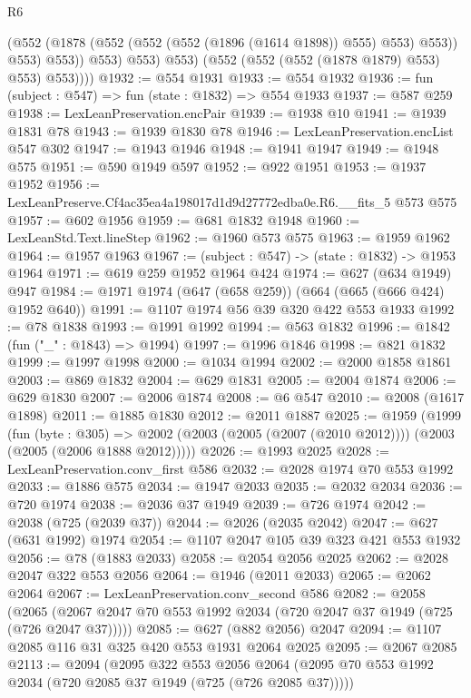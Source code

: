 \begin{lexlean}{R6}
\begin{coremodule}
                    (@552 (@1878 (@552 (@552 (@552 (@1896 (@1614 @1898)) @555) @553) @553)) @553)
                    @553))
                @553)
              @553)
            @553)
          (@552 (@552 (@552 (@1878 @1879) @553) @553) @553))))
@1932 := @554 @1931
@1933 := @554 @1932
@1936 := fun (subject : @547) => fun (state : @1832) => @554 @1933
@1937 := @587 @259
@1938 := LexLeanPreservation.encPair
@1939 := @1938 @10
@1941 := @1939 @1831 @78
@1943 := @1939 @1830 @78
@1946 := LexLeanPreservation.encList @547 @302
@1947 := @1943 @1946
@1948 := @1941 @1947
@1949 := @1948 @575
@1951 := @590 @1949 @597
@1952 := @922 @1951
@1953 := @1937 @1952
@1956 := LexLeanPreserve.Cf4ac35ea4a198017d1d9d27772edba0e.R6.__fits_5 @573 @575
@1957 := @602 @1956
@1959 := @681 @1832 @1948
@1960 := LexLeanStd.Text.lineStep
@1962 := @1960 @573 @575
@1963 := @1959 @1962
@1964 := @1957 @1963
@1967 := (subject : @547) -> (state : @1832) -> @1953 @1964
@1971 := @619 @259 @1952 @1964 @424
@1974 := @627 (@634 @1949) @947
@1984 := @1971 @1974 (@647 (@658 @259)) (@664 (@665 (@666 @424) @1952 @640))
@1991 := @1107 @1974 @56 @39 @320 @422 @553 @1933
@1992 := @78 @1838
@1993 := @1991 @1992
@1994 := @563 @1832
@1996 := @1842 (fun ("_" : @1843) => @1994)
@1997 := @1996 @1846
@1998 := @821 @1832
@1999 := @1997 @1998
@2000 := @1034 @1994
@2002 := @2000 @1858 @1861
@2003 := @869 @1832
@2004 := @629 @1831
@2005 := @2004 @1874
@2006 := @629 @1830
@2007 := @2006 @1874
@2008 := @6 @547
@2010 := @2008 (@1617 @1898)
@2011 := @1885 @1830
@2012 := @2011 @1887
@2025 := @1959
    (@1999
      (fun (byte : @305) =>
      @2002 (@2003 (@2005 (@2007 (@2010 @2012)))) (@2003 (@2005 (@2006 @1888 @2012)))))
@2026 := @1993 @2025
@2028 := LexLeanPreservation.conv_first @586
@2032 := @2028 @1974 @70 @553 @1992
@2033 := @1886 @575
@2034 := @1947 @2033
@2035 := @2032 @2034
@2036 := @720 @1974
@2038 := @2036 @37 @1949
@2039 := @726 @1974
@2042 := @2038 (@725 (@2039 @37))
@2044 := @2026 (@2035 @2042)
@2047 := @627 (@631 @1992) @1974
@2054 := @1107 @2047 @105 @39 @323 @421 @553 @1932
@2056 := @78 (@1883 @2033)
@2058 := @2054 @2056 @2025
@2062 := @2028 @2047 @322 @553 @2056
@2064 := @1946 (@2011 @2033)
@2065 := @2062 @2064
@2067 := LexLeanPreservation.conv_second @586
@2082 := @2058
    (@2065 (@2067 @2047 @70 @553 @1992 @2034 (@720 @2047 @37 @1949 (@725 (@726 @2047 @37)))))
@2085 := @627 (@882 @2056) @2047
@2094 := @1107 @2085 @116 @31 @325 @420 @553 @1931 @2064 @2025
@2095 := @2067 @2085
@2113 := @2094
    (@2095
      @322
      @553
      @2056
      @2064
      (@2095 @70 @553 @1992 @2034 (@720 @2085 @37 @1949 (@725 (@726 @2085 @37)))))

\end{coremodule}
\end{lexlean}
